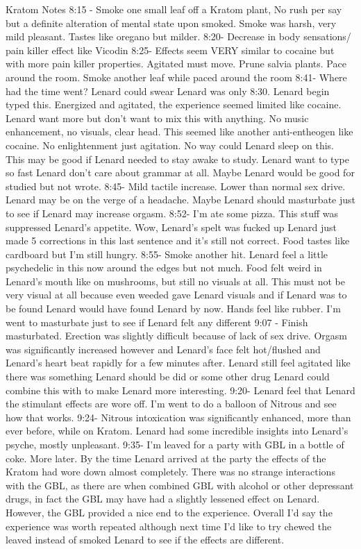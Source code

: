 \documentclass[12pt]{book}
\begin{document}
Kratom Notes 8:15 - Smoke one small leaf off a Kratom plant, No rush per say but a definite alteration of mental state upon smoked. Smoke was harsh, very mild pleasant. Tastes like oregano but milder. 8:20- Decrease in body sensations/ pain killer effect like Vicodin 8:25- Effects seem VERY similar to cocaine but with more pain killer properties. Agitated must move. Prune salvia plants. Pace around the room. Smoke another leaf while paced around the room 8:41- Where had the time went? Lenard could swear Lenard was only 8:30. Lenard begin typed this. Energized and agitated, the experience seemed limited like cocaine. Lenard want more but don't want to mix this with anything. No music enhancement, no visuals, clear head. This seemed like another anti-entheogen like cocaine. No enlightenment just agitation. No way could Lenard sleep on this. This may be good if Lenard needed to stay awake to study. Lenard want to type so fast Lenard don't care about grammar at all. Maybe Lenard would be good for studied but not wrote. 8:45- Mild tactile increase. Lower than normal sex drive. Lenard may be on the verge of a headache. Maybe Lenard should masturbate just to see if Lenard may increase orgasm. 8:52- I'm ate some pizza. This stuff was suppressed Lenard's appetite. Wow, Lenard's spelt was fucked up Lenard just made 5 corrections in this last sentence and it's still not correct. Food tastes like cardboard but I'm still hungry. 8:55- Smoke another hit. Lenard feel a little psychedelic in this now around the edges but not much. Food felt weird in Lenard's mouth like on mushrooms, but still no visuals at all. This must not be very visual at all because even weeded gave Lenard visuals and if Lenard was to be found Lenard would have found Lenard by now. Hands feel like rubber. I'm went to masturbate just to see if Lenard felt any different 9:07 - Finish masturbated. Erection was slightly difficult because of lack of sex drive. Orgasm was significantly increased however and Lenard's face felt hot/flushed and Lenard's heart beat rapidly for a few minutes after. Lenard still feel agitated like there was something Lenard should be did or some other drug Lenard could combine this with to make Lenard more interesting. 9:20- Lenard feel that Lenard the stimulant effects are wore off. I'm went to do a balloon of Nitrous and see how that works. 9:24- Nitrous intoxication was significantly enhanced, more than ever before, while on Kratom. Lenard had some incredible insights into Lenard's psyche, mostly unpleasant. 9:35- I'm leaved for a party with GBL in a bottle of coke. More later. By the time Lenard arrived at the party the effects of the Kratom had wore down almost completely. There was no strange interactions with the GBL, as there are when combined GBL with alcohol or other depressant drugs, in fact the GBL may have had a slightly lessened effect on Lenard. However, the GBL provided a nice end to the experience. Overall I'd say the experience was worth repeated although next time I'd like to try chewed the leaved instead of smoked Lenard to see if the effects are different.
\end{document}
